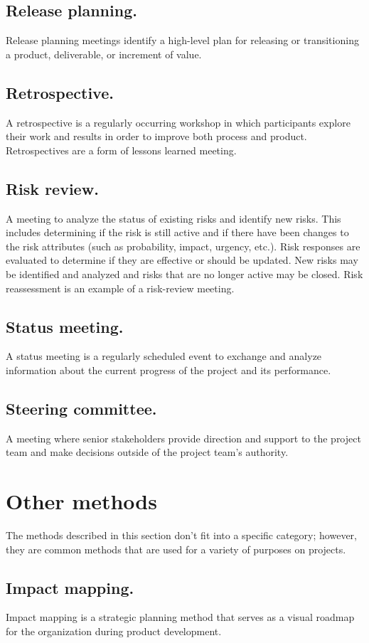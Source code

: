 \documentclass[11pt]{article}
\begin{document}
\subsection{Release planning.}
\label{sec:org0903e9e}
Release planning meetings identify a high-level plan for releasing or transitioning a product, deliverable, or increment of value.
\subsection{Retrospective.}
\label{sec:orgf526f8a}
A retrospective is a regularly occurring workshop in which participants explore their work and results in order to improve both process and product. Retrospectives are a form of lessons learned meeting.
\subsection{Risk review.}
\label{sec:orgeb57744}
A meeting to analyze the status of existing risks and identify new risks. This includes determining if the risk is still active and if there have been changes to the risk attributes (such as probability, impact, urgency, etc.). Risk responses are evaluated to determine if they are effective or should be updated. New risks may be identified and analyzed and risks that are no longer active may be closed. Risk reassessment is an example of a risk-review meeting.
\subsection{Status meeting.}
\label{sec:org36197e7}
A status meeting is a regularly scheduled event to exchange and analyze information about the current progress of the project and its performance.
\subsection{Steering committee.}
\label{sec:org4c334b4}
A meeting where senior stakeholders provide direction and support to the project team and make decisions outside of the project team’s authority.

\section{Other methods}
\label{sec:orgdbb9c04}
The methods described in this section don’t fit into a specific category; however, they are common methods that are used for a variety of purposes on projects.
\subsection{Impact mapping.}
\label{sec:orgace92fa}
Impact mapping is a strategic planning method that serves as a visual roadmap for the organization during product development.
\end{document}
